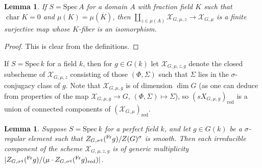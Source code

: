 \documentclass[11pt,reqno]{amsart}
\newtheorem{lemma}[theorem]{Lemma}
\theoremstyle{definition}
\renewcommand{\rm}{\mathrm}
\newcommand{\Spec}{\mathrm{Spec} \,}
\newcommand{\sX}{{\mathscr X}}
\DeclareMathOperator{\chara}{char}
\newcommand{\ov}[1]{\overline{#1}}
\begin{document}


\begin{lemma}\label{lemma:finite-gen-iso}
    If $S = \Spec A$ for a domain $A$ with fraction field $K$ such that $\chara K = 0$ and $\mu(K) = \mu(\ov{K})$, then $\coprod_{z \in \mu(A)} \sX_{G, \mu, z} \to \sX_{G,\mu}$ is a finite surjective map whose $K$-fiber is an isomorphism.
\end{lemma}

\begin{proof}
    This is clear from the definitions.
\end{proof}

If $S = \Spec k$ for a field $k$, then for $g \in G(k)$ let $\sX_{G,\mu,z,g}$ denote the closed subscheme of $\sX_{G,\mu,z}$ consisting of those $(\Phi, \Sigma)$ such that $\Sigma$ lies in the $\sigma$-conjugacy class of $g$. Note that $\sX_{G,\mu,g}$ is of dimension $\dim G$ (as one can deduce from properties of the map $\sX_{G,\mu,g} \to G$, $(\Phi, \Sigma) \mapsto \Sigma$), so $(sX_{G,\mu,g})_\rm{red}$ is a union of connected components of $(\sX_{G,\mu})_{\rm{red}}$.

\begin{lemma}\label{lemma:unip-comp-mult}
    Suppose $S = \Spec k$ for a perfect field $k$, and let $g \in G(k)$ be a $\sigma$-regular element such that $Z_{G,\sigma^q}(\prescript{\rm{Fr}}{}{g})/Z(G)^\sigma$ is smooth. Then each irreducible component of the scheme
    $\sX_{G,\mu,z,g}$
    is of generic multiplicity $|Z_{G,\sigma^q}(\prescript{\rm{Fr}}{}{g})/(\mu \cdot Z_{G,\sigma^q}(\prescript{\rm{Fr}}{}{g})_{\rm{red}})|$.
\end{lemma}
\end{document}
